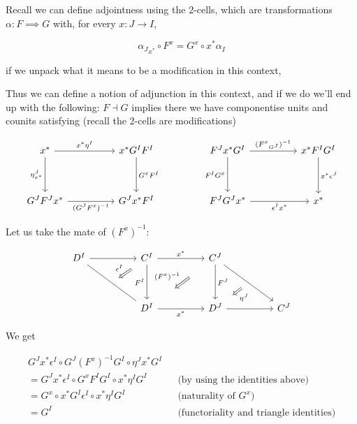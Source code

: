 \documentclass[10pt, oneside]{article}
\begin{document}
Recall we can define adjointness using the $2$-cells, which are transformations $\alpha: F \implies G$ with, for every $x: J \to I$,

$${\alpha_J}_{x^\ast} \circ F^x = G^x \circ x^\ast \alpha_I$$

\noindent if we unpack what it means to be a modification in this context,

Thus we can define a notion of adjunction in this context, and if we do we'll end up with the following: $F \dashv G$ implies there we have componentise units and counits satisfying (recall the 2-cells are modifications)

\[\begin{tikzcd}
	{x^\ast} && {x^\ast G^I F^I} && {F^J x^\ast G^I} && {x^\ast F^I G^I} \\
	\\
	{G^JF^Jx^\ast} && {G^J x^\ast F^I} && {F^J G^J x^\ast} && {x^\ast}
	\arrow["{\eta^J_{x^\ast}}"', from=1-1, to=3-1]
	\arrow["{( G^JF^x )^{-1}}"', from=3-1, to=3-3]
	\arrow["{x^\ast \eta^I}", from=1-1, to=1-3]
	\arrow["{G^x F^I}", from=1-3, to=3-3]
	\arrow["{({F^x}_{G^J})^{-1}}", from=1-5, to=1-7]
	\arrow["{F^I G^x}"', from=1-5, to=3-5]
	\arrow["{\epsilon^I x^\ast}"', from=3-5, to=3-7]
	\arrow["{x^\ast \epsilon^J}", from=1-7, to=3-7]
\end{tikzcd}\]

Let us take the mate of $(F^x)^{-1}$:

\[\begin{tikzcd}
	{D^I} && {C^I} && {C^J} \\
	\\
	&& {D^I} && {D^J} && {C^J}
	\arrow["{x^\ast}", from=1-3, to=1-5]
	\arrow["{F^I}"', from=1-3, to=3-3]
	\arrow["{x^\ast}"', from=3-3, to=3-5]
	\arrow["{F^J}", from=1-5, to=3-5]
	\arrow["{(F^x)^{-1}}"', shorten <=22pt, shorten >=22pt, Rightarrow, from=1-5, to=3-3]
	\arrow[from=1-1, to=1-3]
	\arrow[""{name=0, anchor=center, inner sep=0}, no head, from=1-1, to=3-3]
	\arrow[from=3-5, to=3-7]
	\arrow[""{name=1, anchor=center, inner sep=0}, from=1-5, to=3-7]
	\arrow["{\epsilon^I}"', shorten <=8pt, shorten >=8pt, Rightarrow, from=1-3, to=0]
	\arrow["{\eta^J}", shorten <=8pt, shorten >=8pt, Rightarrow, from=1, to=3-5]
\end{tikzcd}\]

We get


\begin{align*}
         G^J x^\ast \epsilon^I \circ G^J (F^x)^{-1} G^I \circ \eta^J x^\ast G^I \\
         = G^J x^\ast \epsilon^I \circ G^x F^I G^I \circ x^\ast \eta^I G^I && \text{(by using the identities above)} \\
         = G^x \circ x^\ast G^I \epsilon^I \circ x^\ast \eta^I G^I && \text{(naturality of $G^x$)} \\
         = G^I  && \text{(functoriality and triangle identities)} \\
\end{align*}
\end{document}
